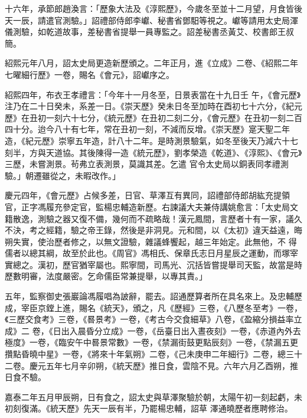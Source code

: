 \begin{pinyinscope}
 十六年，承節郎趙渙言：「歷象大法及《淳熙歷》，今歲冬至並十二月望，月食皆後天一辰，請遣官測驗。」詔禮部侍郎李巘、秘書省鄧馹等視之。巘等請用太史局渾儀測驗，如乾道故事，差秘書省提舉一員專監之。詔差秘書丞黃艾、校書郎王叔簡。



 紹熙元年八月，詔太史局更造新歷頒之。二年正月，進《立成》二卷、《紹熙二年七曜細行歷》一卷，賜名《會元》，詔巘序之。



 紹熙四年，布衣王孝禮言：「今年十一月冬至，日景表當在十九日壬
 午，《會元歷》注乃在二十日癸未，系差一日。《崇天歷》癸未日冬至加時在酉初七十六分，《紀元歷》在丑初一刻六十七分，《統元歷》在丑初二刻二分，《會元歷》在丑初一刻二百四十分。迨今八十有七年，常在丑初一刻，不減而反增。《崇天歷》寔天聖二年造，《紀元歷》崇寧五年造，計八十二年。是時測景驗氣，如冬至後天乃減六十七刻半，方與天道協。其後陳得一造《統元歷》，劉孝榮造《乾道》、《淳熙》、《會元》三歷，未嘗測景。茍弗立表測景，莫識其差。乞遣
 官令太史局以銅表同孝禮測驗。」朝遷雖從之，未暇改作。」



 慶元四年，《會元歷》占候多差，日官、草澤互有異同，詔禮部侍郎胡紘充提領官，正字馮履充參定官，監楊忠輔造新歷。右諫議大夫兼侍講姚愈言：「太史局文籍散逸，測驗之器又復不備，幾何而不疏略哉！漢元鳳間，言歷者十有一家，議久不決，考之經籍，驗之帝王錄，然後是非洞見。元和間，以《太初》違天益遠，晦朔失實，使治歷者修之，以無文證驗，雜議蜂饗起，越三年始定。此無他，不
 得儒者以總其綱，故至於此也。《周官》馮相氏、保章氏志日月星辰之運動，而塚宰實總之。漢初，歷官猶宰屬也。熙寧間，司馬光、沉括皆嘗提舉司天監，故當是時歷數明審，法度嚴密。乞命儒臣常兼提舉，以專其責。」



 五年，監察御史張巖論馮履唱為詖辭，罷去。詔通歷算者所在具名來上。及忠輔歷成，宰臣京鏜上進，賜名《統天》，頒之，凡《歷經》三卷，《八歷冬至考》一卷，《三歷交食考》三卷，《晷景考》一卷，《考古今交食細草》八卷，《盈縮分損益率立成》二
 卷，《日出入晨昏分立成》一卷，《岳臺日出入晝夜刻》一卷，《赤道內外去極度》一卷，《臨安午中晷景常數》一卷，《禁漏街鼓更點辰刻》一卷，《禁漏五更攢點昏曉中星》一卷，《將來十年氣朔》二卷，《己未庚申二年細行》二卷，總三十二卷。慶元五年七月辛卯朔，《統天歷》推日食，雲陰不見。六年六月乙酉朔，推日食不驗。



 嘉泰二年五月甲辰朔，日有食之，詔太史與草澤聚驗於朝，太陽午初一刻起虧，未初刻復滿。《統天歷》先天一辰有半，乃罷楊忠輔，詔草
 澤通曉歷者應聘修治。




\end{pinyinscope}
